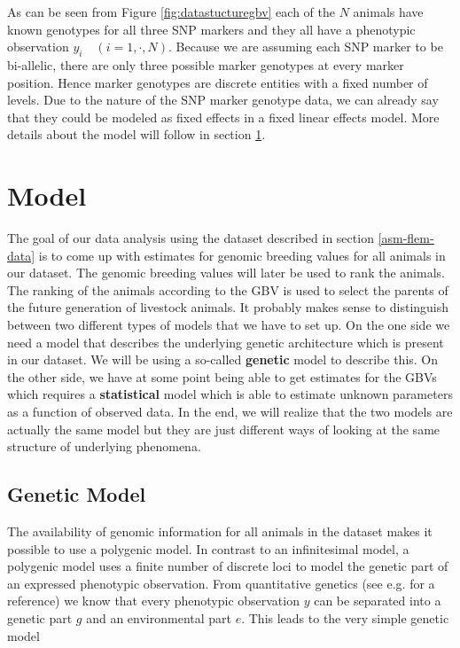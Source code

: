 \documentclass[]{book}
\theoremstyle{definition}
\theoremstyle{definition}
\theoremstyle{definition}
\theoremstyle{remark}
\begin{document}
As can be seen from Figure \ref{fig:datastucturegbv} each of the \(N\) animals have known genotypes for all three SNP markers and they all have a phenotypic observation \(y_i \quad (i = 1, \cdot, N)\). Because we are assuming each SNP marker to be bi-allelic, there are only three possible marker genotypes at every marker position. Hence marker genotypes are discrete entities with a fixed number of levels. Due to the nature of the SNP marker genotype data, we can already say that they could be modeled as fixed effects in a fixed linear effects model. More details about the model will follow in section \ref{asm-flem-model}.

\hypertarget{asm-flem-model}{%
\section{Model}\label{asm-flem-model}}

The goal of our data analysis using the dataset described in section \ref{asm-flem-data} is to come up with estimates for genomic breeding values for all animals in our dataset. The genomic breeding values will later be used to rank the animals. The ranking of the animals according to the GBV is used to select the parents of the future generation of livestock animals. It probably makes sense to distinguish between two different types of models that we have to set up. On the one side we need a model that describes the underlying genetic architecture which is present in our dataset. We will be using a so-called \textbf{genetic} model to describe this. On the other side, we have at some point being able to get estimates for the GBVs which requires a \textbf{statistical} model which is able to estimate unknown parameters as a function of observed data. In the end, we will realize that the two models are actually the same model but they are just different ways of looking at the same structure of underlying phenomena.

\hypertarget{asm-flem-genetic-model}{%
\subsection{Genetic Model}\label{asm-flem-genetic-model}}

The availability of genomic information for all animals in the dataset makes it possible to use a polygenic model. In contrast to an infinitesimal model, a polygenic model uses a finite number of discrete loci to model the genetic part of an expressed phenotypic observation. From quantitative genetics (see e.g. \citep{Falconer1996} for a reference) we know that every phenotypic observation \(y\) can be separated into a genetic part \(g\) and an environmental part \(e\). This leads to the very simple genetic model
\end{document}
